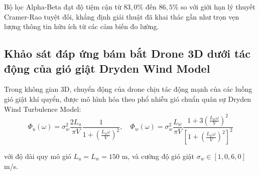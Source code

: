 \begin{table}[H]
\centering
\caption{So sánh sai số RMSE thực nghiệm của các bộ lọc với giới hạn lý thuyết Cramer-Rao CRLB}
\label{tab:cramer-rao-bound-comparison}
\end{table}

Bộ lọc Alpha-Beta đạt độ tiệm cận từ $83{,}0\%$ đến $86{,}5\%$ so với giới hạn lý thuyết Cramer-Rao tuyệt đối, khẳng định giải thuật đã khai thác gần như trọn vẹn lượng thông tin hữu ích từ các cảm biến đo lường.

\subsection{Khảo sát đáp ứng bám bắt Drone 3D dưới tác động của gió giật Dryden Wind Model}

\hspace{0.5cm} Trong không gian 3D, chuyển động của drone chịu tác động mạnh của các luồng gió giật khí quyển, được mô hình hóa theo phổ nhiễu gió chuẩn quân sự Dryden Wind Turbulence Model:
\begin{equation}
\Phi_u(\omega) = \sigma_w^2 \frac{2 L_u}{\pi V} \frac{1}{1 + \left( \frac{L_u \omega}{V} \right)^2}, \quad \Phi_w(\omega) = \sigma_w^2 \frac{L_w}{\pi V} \frac{1 + 3\left( \frac{L_w \omega}{V} \right)^2}{\left[ 1 + \left( \frac{L_w \omega}{V} \right)^2 \right]^2}
\label{eq:dryden-wind-turbulence-spectrum}
\end{equation}

với độ dài quy mô gió $L_u = L_w = 150$ m, và cường độ gió giật $\sigma_w \in [1{,}0, 6{,}0]$ m/s.

